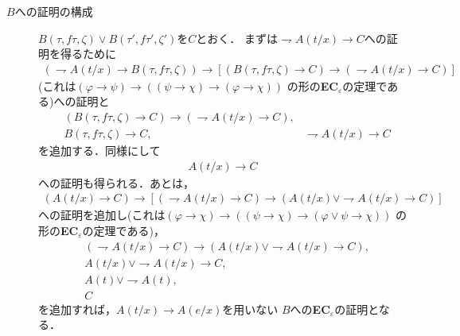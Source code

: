 \begin{description}
		\item[$B$への証明の構成]
			$B(\tau,f\tau,\zeta) \vee B(\tau',f\tau',\zeta')$を$C$とおく．
			まずは$\rightharpoondown A(t/x) \rightarrow C$への証明を得るために
			\begin{align}
				(\rightharpoondown A(t/x) \rightarrow B(\tau,f\tau,\zeta))
				\rightarrow [(B(\tau,f\tau,\zeta) \rightarrow C)
				\rightarrow (\rightharpoondown A(t/x) \rightarrow C)]
			\end{align}
			(これは$(\varphi \rightarrow \psi) \rightarrow
			((\psi \rightarrow \chi) \rightarrow (\varphi \rightarrow \chi))$
			の形の{\bf EC}${}_{\varepsilon}$の定理である)への証明と
			\begin{align}
				&(B(\tau,f\tau,\zeta) \rightarrow C)
					\rightarrow (\rightharpoondown A(t/x) \rightarrow C), \\
				&B(\tau,f\tau,\zeta) \rightarrow C,
				&\rightharpoondown A(t/x) \rightarrow C
			\end{align}
			を追加する．同様にして
			\begin{align}
				A(t/x) \rightarrow C
			\end{align}
			への証明も得られる．あとは，
			\begin{align}
				(A(t/x) \rightarrow C) \rightarrow
				\left[ (\rightharpoondown A(t/x) \rightarrow C) \rightarrow
				(A(t/x) \vee \rightharpoondown A(t/x) \rightarrow C)\right]
			\end{align}
			への証明を追加し(これは$(\varphi \rightarrow \chi) \rightarrow
			((\psi \rightarrow \chi) \rightarrow 
			(\varphi \vee \psi \rightarrow \chi))$
			の形の{\bf EC}${}_{\varepsilon}$の定理である)，
			\begin{align}
				&(\rightharpoondown A(t/x) \rightarrow C) \rightarrow
				(A(t/x) \vee \rightharpoondown A(t/x) \rightarrow C), \\
				&A(t/x) \vee \rightharpoondown A(t/x) \rightarrow C, \\
				&A(t) \vee \rightharpoondown A(t), \\
				&C
			\end{align}
			を追加すれば，$A(t/x) \rightarrow A(e/x)$を用いない
			$B$への{\bf EC}${}_{\varepsilon}$の証明となる．
			\QED
	\end{description}